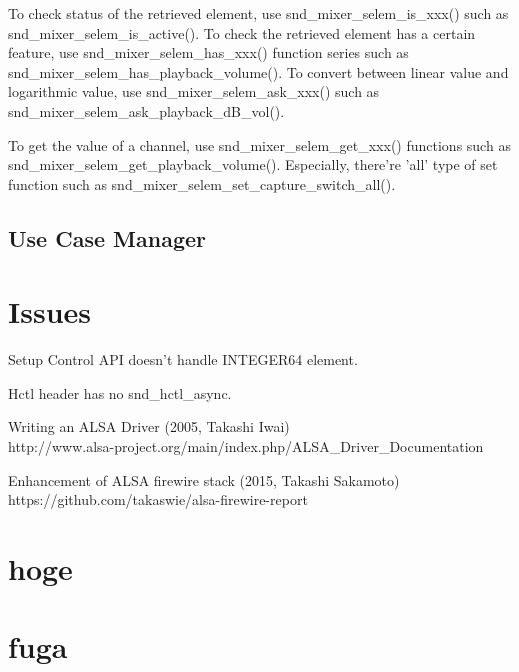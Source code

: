 \documentclass[onecolumn]{article}
\begin{document}
To check status of the retrieved element, use snd\_mixer\_selem\_is\_xxx() such as snd\_mixer\_selem\_is\_active(). To check the retrieved element has a certain feature, use snd\_mixer\_selem\_has\_xxx() function series such as snd\_mixer\_selem\_has\_playback\_volume(). To convert between linear value and logarithmic value, use snd\_mixer\_selem\_ask\_xxx() such as snd\_mixer\_selem\_ask\_playback\_dB\_vol().

To get the value of a channel, use snd\_mixer\_selem\_get\_xxx() functions such as snd\_mixer\_selem\_get\_playback\_volume(). Especially, there're 'all' type of set function such as snd\_mixer\_selem\_set\_capture\_switch\_all().


\subsection{Use Case Manager}

\section{Issues}

Setup Control API doesn't handle INTEGER64 element.

Hctl header has no snd\_hctl\_async.

\begin{thebibliography}{99}


Writing an ALSA Driver (2005, Takashi Iwai) \\
http://www.alsa-project.org/main/index.php/ALSA\_Driver\_Documentation

\bibitem{}
Enhancement of ALSA firewire stack (2015, Takashi Sakamoto) \\
https://github.com/takaswie/alsa-firewire-report

\end{thebibliography}

\newpage

\appendix


\section{hoge}

\section{fuga}
\end{document}
